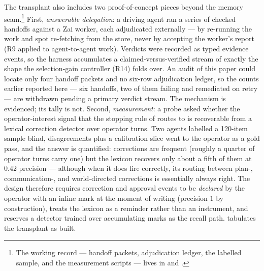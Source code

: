 The transplant also includes two proof-of-concept pieces beyond the memory seam.\footnote{The working record --- handoff packets, adjudication ledger, the labelled sample, and the measurement scripts --- lives in  and .}  First, \emph{answerable delegation}: a driving agent ran a series of checked handoffs against a Zai worker, each adjudicated externally --- by re-running the work and spot re-fetching from the store, never by accepting the worker's report (R9 applied to agent-to-agent work).  Verdicts were recorded as typed evidence events, so the harness accumulates a claimed-versus-verified stream of exactly the shape the selection-gain controller (R14) folds over.  An audit of this paper could locate only four handoff packets and no six-row adjudication ledger, so the counts earlier reported here --- six handoffs, two of them failing and remediated on retry --- are withdrawn pending a primary verdict stream.  The mechanism is evidenced; its tally is not.  Second, \emph{measurement}: a probe asked whether the operator-interest signal that the stopping rule of \xprereg{} routes to is recoverable from a lexical correction detector over operator turns.  Two agents labelled a 120-item sample blind, disagreements plus a calibration slice went to the operator as a gold pass, and the answer is quantified: corrections are frequent (roughly a quarter of operator turns carry one) but the lexicon recovers only about a fifth of them at $0.42$ precision --- although when it does fire correctly, its routing between plan-, communication-, and world-directed corrections is essentially always right.  The design therefore requires correction and approval events to be \emph{declared} by the operator with an inline mark at the moment of writing (precision $1$ by construction), treats the lexicon as a reminder rather than an instrument, and reserves a detector trained over accumulating marks as the recall path.  \xzaif{} tabulates the transplant as built.

